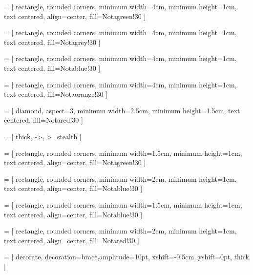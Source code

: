 \usepackage{tikz}
\usetikzlibrary{shapes.geometric, arrows}

 = [
    rectangle, rounded corners, 
    minimum width=4cm, 
    minimum height=1cm,
    text centered,  
    align=center,
    fill=Notagreen!30
]

 = [
    rectangle, rounded corners, 
    minimum width=4cm, 
    minimum height=1cm,
    text centered,  
    fill=Notagrey!30
]

 = [
    rectangle, rounded corners, 
    minimum width=4cm, 
    minimum height=1cm, 
    text centered, 
    fill=Notablue!30
]

 = [
    rectangle, rounded corners, 
    minimum width=4cm, 
    minimum height=1cm, 
    text centered, 
    fill=Notaorange!30
]

 = [
    diamond,
    aspect=3,
    minimum width=2.5cm, 
    minimum height=1.5cm, 
    text centered, 
    fill=Notared!30
]

 = [
    thick,
    ->,
    >=stealth
]

 = [
    rectangle, rounded corners, 
    minimum width=1.5cm, 
    minimum height=1cm,
    text centered,  
    align=center,
    fill=Notagreen!30
]

 = [
    rectangle, rounded corners, 
    minimum width=2cm, 
    minimum height=1cm,
    text centered,  
    align=center,
    fill=Notablue!30
]

 = [
    rectangle, rounded corners, 
    minimum width=1.5cm, 
    minimum height=1cm,
    text centered,  
    align=center,
    fill=Notablue!30
]

 = [
    rectangle, rounded corners, 
    minimum width=2cm, 
    minimum height=1cm,
    text centered,  
    align=center,
    fill=Notared!30
]

 = [
    decorate,
    decoration={brace,amplitude=10pt},
    xshift=-0.5cm,
    yshift=0pt,
    thick
]